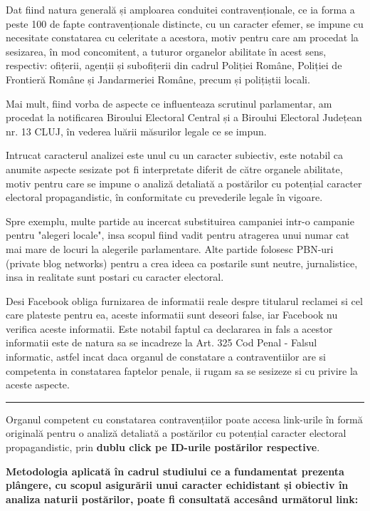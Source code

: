 \documentclass[a4paper,12pt]{article}
\begin{document}
Dat fiind natura generală și amploarea conduitei contravenționale, ce ia forma a peste 100 de fapte contravenționale distincte, cu un caracter efemer, se impune cu necesitate constatarea cu celeritate a acestora, motiv pentru care am procedat la sesizarea, în mod concomitent, a tuturor organelor abilitate în acest sens, respectiv: ofițerii, agenții și subofițerii din cadrul Poliției Române, Poliției de Frontieră Române și Jandarmeriei Române, precum și polițiștii locali.

Mai mult, fiind vorba de aspecte ce influenteaza scrutinul parlamentar, am procedat la notificarea Biroului Electoral Central și a Biroului Electoral Județean nr. 13 CLUJ, în vederea luării măsurilor legale ce se impun.

Intrucat caracterul analizei este unul cu un caracter subiectiv, este notabil ca anumite aspecte sesizate pot fi interpretate diferit de către organele abilitate, motiv pentru care se impune o analiză detaliată a postărilor cu potențial caracter electoral propagandistic, în conformitate cu prevederile legale în vigoare.

Spre exemplu, multe partide au incercat substituirea campaniei intr-o campanie pentru "alegeri locale", insa scopul fiind vadit pentru atragerea unui numar cat mai mare de locuri la alegerile parlamentare. Alte partide folosesc PBN-uri (private blog networks) pentru a crea ideea ca postarile sunt neutre, jurnalistice, insa in realitate sunt postari cu caracter electoral.

Desi Facebook obliga furnizarea de informatii reale despre titularul reclamei si cel care plateste pentru ea, aceste informatii sunt deseori false, iar Facebook nu verifica aceste informatii. Este notabil faptul ca declararea in fals a acestor informatii este de natura sa se incadreze la Art. 325 Cod Penal - Falsul informatic, astfel incat daca organul de constatare a contraventiilor are si competenta in constatarea faptelor penale, ii rugam sa se sesizeze si cu privire la aceste aspecte.

\noindent\rule{\textwidth}{1pt}

Organul competent cu constatarea contravențiilor poate accesa link-urile în formă originală pentru o analiză detaliată a postărilor cu potențial caracter electoral propagandistic, prin \textbf{dublu click pe ID-urile postărilor respective}.

\textbf{Metodologia aplicată în cadrul studiului ce a fundamentat prezenta plângere, cu scopul asigurării unui caracter echidistant și obiectiv în analiza naturii postărilor, poate fi consultată accesând următorul link:}
\end{document}
